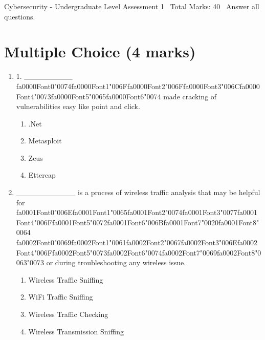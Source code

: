 \documentclass[12pt]{article}
\begin{document}
\begin{center}
Cybersecurity - Undergraduate Level Assessment 1 \
Total Marks: 40 \
Answer all questions.
\end{center}

\section*{Multiple Choice (4 marks)}
\begin{enumerate}[label=\arabic*.]
\item 1. \_\_\_\_\_\_\_\_\_ {\csname fa0000Font0\endcsname\char"0074}{\csname fa0000Font1\endcsname\char"006F}{\csname fa0000Font2\endcsname\char"006F}{\csname fa0000Font3\endcsname\char"006C}{\csname fa0000Font4\endcsname\char"0073}{\csname fa0000Font5\endcsname\char"0065}{\csname fa0000Font6\endcsname\char"0074} made cracking of vulnerabilities easy like point and click.
\begin{enumerate}[label=(\alph*)]
    \item .Net
    \item Metasploit
    \item Zeus
    \item Ettercap
\end{enumerate}
\item \_\_\_\_\_\_\_\_\_\_\_ is a process of wireless traffic analysis that may be helpful for {\csname fa0001Font0\endcsname\char"006E}{\csname fa0001Font1\endcsname\char"0065}{\csname fa0001Font2\endcsname\char"0074}{\csname fa0001Font3\endcsname\char"0077}{\csname fa0001Font4\endcsname\char"006F}{\csname fa0001Font5\endcsname\char"0072}{\csname fa0001Font6\endcsname\char"006B}{\csname fa0001Font7\endcsname\char"0020}{\csname fa0001Font8\endcsname\char"0064} {\csname fa0002Font0\endcsname\char"0069}{\csname fa0002Font1\endcsname\char"0061}{\csname fa0002Font2\endcsname\char"0067}{\csname fa0002Font3\endcsname\char"006E}{\csname fa0002Font4\endcsname\char"006F}{\csname fa0002Font5\endcsname\char"0073}{\csname fa0002Font6\endcsname\char"0074}{\csname fa0002Font7\endcsname\char"0069}{\csname fa0002Font8\endcsname\char"0063}{\char"0073} or during troubleshooting any wireless issue.
\begin{enumerate}[label=(\alph*)]
    \item Wireless Traffic Sniffing
    \item WiFi Traffic Sniffing
    \item Wireless Traffic Checking
    \item Wireless Transmission Sniffing
\end{enumerate}
\end{enumerate}
\end{document}
